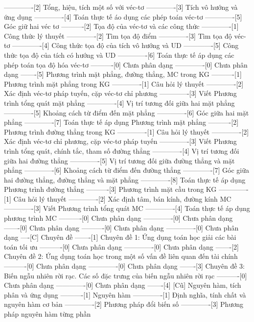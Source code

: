 -------------[2] Tổng, hiệu, tích một số với véc-tơ
-------------[3] Tích vô hướng và ứng dụng
-------------[4] Toán thực tế áo dụng các phép toán véc-tơ
-------------[5] Góc giữ hai véc tơ
----------[2] Tọa độ của véc-tơ và các công thức
-------------[1] Công thức lý thuyết
-------------[2] Tìm tọa độ điểm
-------------[3] Tìm tọa độ véc-tơ
-------------[4] Công thức tọa độ của tích vô hướng và UD
-------------[5] Công thức tọa độ của tích có hướng và UD
-------------[6] Toán thực tế áp dụng các phép toán tọa độ hóa véc-tơ
----------[0] Chưa phân dạng
-------------[0] Chưa phân dạng
-------[5] Phương trình mặt phẳng, đường thẳng, MC trong KG 
----------[1] Phương trình mặt phẳng trong KG
-------------[1] Câu hỏi lý thuyết
-------------[2] Xác định véc-tơ pháp tuyến, cặp véc-tơ chỉ phương
-------------[3] Viết Phương trình tổng quát mặt phẳng
-------------[4] Vị trí tương đối giữa hai mặt phẳng
-------------[5] Khoảng cách từ điểm đến mặt phẳng
-------------[6] Góc giữa hai mặt phẳng
-------------[7] Toán thực tế áp dụng Phương trình mặt phẳng
----------[2] Phương trình đường thẳng trong KG
-------------[1] Câu hỏi lý thuyết
-------------[2] Xác định véc-tơ chỉ phương, cặp véc-tơ pháp tuyến
-------------[3] Viết Phương trình tổng quát, chính tắc, tham số đường thẳng
-------------[4] Vị trí tương đối giữa hai đường thẳng
-------------[5] Vị trí tương đối giữa đường thẳng và mặt phẳng
-------------[6] Khoảng cách từ điểm đến đường thẳng
-------------[7] Góc giữa hai đường thẳng, đường thẳng và mặt phẳng
-------------[8] Toán thực tế áp dụng Phương trình đường thẳng
----------[3] Phương trình mặt cầu trong KG
-------------[1] Câu hỏi lý thuyết
-------------[2] Xác định tâm, bán kính, đường kính MC
-------------[3] Viết Phương trình tổng quát MC
-------------[4] Toán thực tế áp dụng phương trình MC
----------[0] Chưa phân dạng
-------------[0] Chưa phân dạng
-------[0] Chưa phân dạng
----------[0] Chưa phân dạng
-------------[0] Chưa phân dạng
----[C] Chuyên đề
-------[1] Chuyên đề 1: Ứng dụng toán học giải các bài toán tối ưu
----------[0] Chưa phân dạng
-------------[0] Chưa phân dạng
-------[2] Chuyên đề 2: Ứng dụng toán học trong một số vấn đề liên quan đến tài chính
----------[0] Chưa phân dạng
-------------[0] Chưa phân dạng
-------[3] Chuyên đề 3: Biến ngẫu nhiên rời rạc. Các số đặc trưng của biến ngẫu nhiên rời rạc
----------[0] Chưa phân dạng
-------------[0] Chưa phân dạng
-------[4] [Cũ] Nguyên hàm, tích phân và ứng dụng
----------[1] Nguyên hàm
-------------[1] Định nghĩa, tính chất và nguyên hàm cơ bản
-------------[2] Phương pháp đổi biến số
-------------[3] Phương pháp nguyên hàm từng phần
